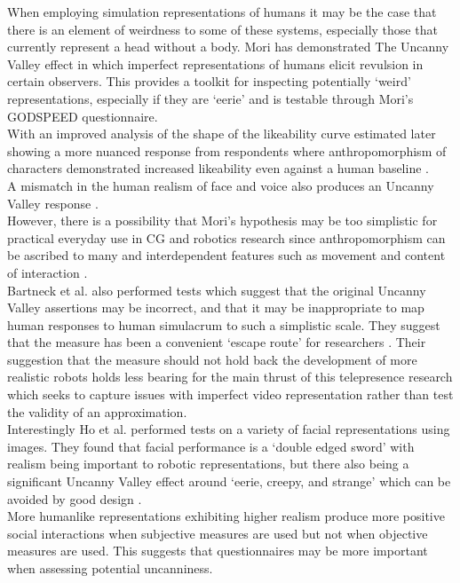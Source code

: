 When employing simulation representations of humans it may be the case that there is an element of weirdness to some of these systems, especially those that currently represent a head without a body. Mori has demonstrated The Uncanny Valley \cite{Mori1970} effect in which imperfect representations of humans elicit revulsion in certain observers. This provides a toolkit for inspecting potentially `weird' representations, especially if they are `eerie' and is testable through Mori's GODSPEED questionnaire. \\
                    With an improved analysis of the shape of the likeability curve estimated later showing a more nuanced response from respondents where anthropomorphism of characters demonstrated increased likeability even against a human baseline \cite{Bartneck2007, Bartneck2009a}.\\
                    A mismatch in the human realism of face and voice also produces an Uncanny Valley response \cite{Mitchell2011}.\\
                    However, there is a possibility that Mori's hypothesis may be too simplistic for practical everyday use in CG and robotics research since anthropomorphism can be ascribed to many and interdependent features such as movement and content of interaction \cite{Bartneck2009}.\\
                    Bartneck et al. also performed tests which suggest that the original Uncanny Valley assertions may be incorrect, and that it may be inappropriate to map human responses to human simulacrum to such a simplistic scale. They suggest that the measure has been a convenient `escape route' for researchers \cite{Bartneck2009}. Their suggestion that the measure should not hold back the development of more realistic robots holds less bearing for the main thrust of this telepresence research which seeks to capture issues with imperfect video representation rather than test the validity of an approximation.\\
                    Interestingly Ho et al. performed tests on a variety of facial representations using images.  They found that facial performance is a `double edged sword' with realism being important to robotic representations, but there also being a significant Uncanny Valley effect around `eerie, creepy, and strange' which can be avoided by good design \cite{Ho2008}.\\
                    More humanlike representations exhibiting higher realism produce more positive social interactions when subjective measures are used \cite{Yee2007a} but not when objective measures are used. This suggests that questionnaires may be more important when assessing potential uncanniness.\\
